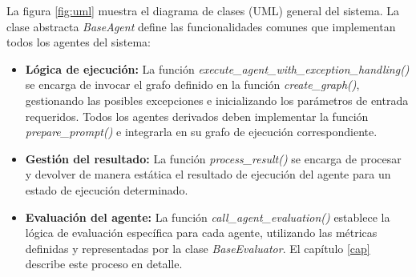 La figura \ref{fig:uml} muestra el diagrama de clases (UML) general del sistema. La clase abstracta \textit{BaseAgent} define las funcionalidades comunes que implementan todos los agentes del sistema:
\begin{itemize}
\item \textbf{Lógica de ejecución:} La función \textit{execute\_agent\_with\_exception\_handling()} se encarga de invocar el grafo definido en la función \textit{create\_graph()}, gestionando las posibles excepciones e inicializando los parámetros de entrada requeridos. Todos los agentes derivados deben implementar la función \textit{prepare\_prompt()} e integrarla en su grafo de ejecución correspondiente.
\item \textbf{Gestión del resultado:} La función \textit{process\_result()} se encarga de procesar y devolver de manera estática el resultado de ejecución del agente para un estado de ejecución determinado.
\item \textbf{Evaluación del agente:} La función \textit{call\_agent\_evaluation()} establece la lógica de evaluación específica para cada agente, utilizando las métricas definidas y representadas por la clase \textit{BaseEvaluator}. El capítulo \ref{cap} describe este proceso en detalle.
\end{itemize}

